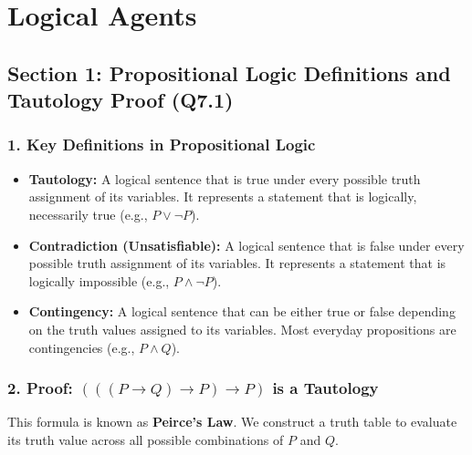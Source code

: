 \chapter{Logical Agents}



\section{Section 1: Propositional Logic Definitions and Tautology Proof (Q7.1)}

\subsection{1. Key Definitions in Propositional Logic}

\begin{itemize}
  \item   \textbf{Tautology:} A logical sentence that is true under every possible truth assignment of its variables. It represents a statement that is logically, necessarily true (e.g., $P \lor \neg P$).
  \item   \textbf{Contradiction (Unsatisfiable):} A logical sentence that is false under every possible truth assignment of its variables. It represents a statement that is logically impossible (e.g., $P \land \neg P$).
  \item   \textbf{Contingency:} A logical sentence that can be either true or false depending on the truth values assigned to its variables. Most everyday propositions are contingencies (e.g., $P \land Q$).
\end{itemize}


\subsection{2. Proof: $(((P \rightarrow Q) \rightarrow P) \rightarrow P)$ is a Tautology}
This formula is known as \textbf{Peirce's Law}. We construct a truth table to evaluate its truth value across all possible combinations of $P$ and $Q$.


